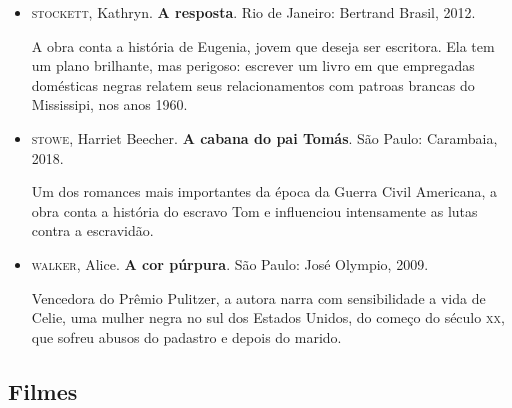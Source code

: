\documentclass[12pt]{extarticle}
\begin{document}
\begin{itemize}
\item\textsc{stockett}, Kathryn. \textbf{A resposta}. Rio de Janeiro: Bertrand
  Brasil, 2012.

A obra conta a história de Eugenia, jovem que deseja ser escritora. Ela
tem um plano brilhante, mas perigoso: escrever um livro em que
empregadas domésticas negras relatem seus relacionamentos com patroas
brancas do Mississipi, nos anos 1960.

\item\textsc{stowe}, Harriet Beecher. \textbf{A cabana do pai Tomás}. São Paulo:
  Carambaia, 2018.

Um dos romances mais importantes da época da Guerra Civil Americana, a
obra conta a história do escravo Tom e influenciou intensamente as lutas
contra a escravidão.

\item\textsc{walker}, Alice. \textbf{A cor púrpura}. São Paulo: José Olympio, 2009.

Vencedora do Prêmio Pulitzer, a autora narra com sensibilidade a vida de
Celie, uma mulher negra no sul dos Estados Unidos, do começo do século
\textsc{xx}, que sofreu abusos do padastro e depois do marido.
\end{itemize}

\subsection{Filmes}
\end{document}
